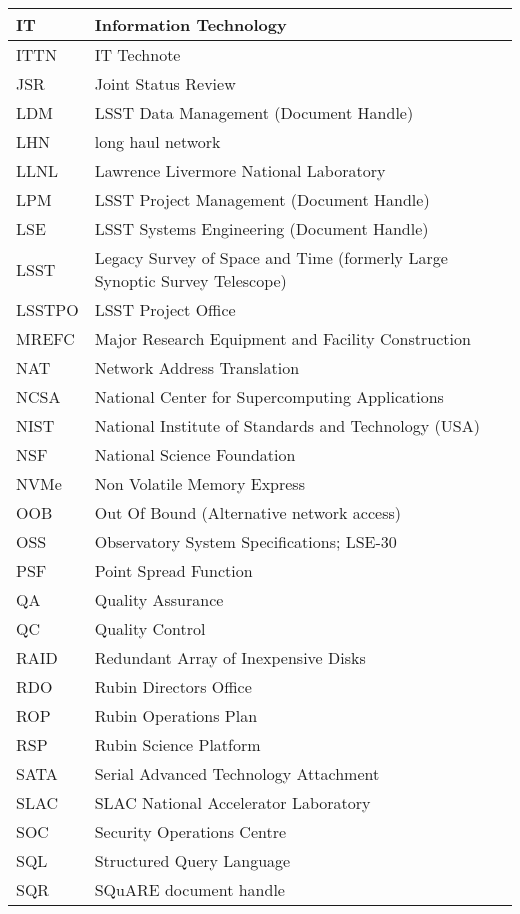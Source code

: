 \begin{longtable}{p{}p{}}
IT & Information Technology \\\hline
ITTN & IT Technote \\\hline
JSR & Joint Status Review \\\hline
LDM & LSST Data Management (Document Handle) \\\hline
LHN & long haul network \\\hline
LLNL & Lawrence Livermore National Laboratory \\\hline
LPM & LSST Project Management (Document Handle) \\\hline
LSE & LSST Systems Engineering (Document Handle) \\\hline
LSST & Legacy Survey of Space and Time (formerly Large Synoptic Survey Telescope) \\\hline
LSSTPO & LSST Project Office \\\hline
MREFC & Major Research Equipment and Facility Construction \\\hline
NAT & Network Address Translation \\\hline
NCSA & National Center for Supercomputing Applications \\\hline
NIST & National Institute of Standards and Technology (USA) \\\hline
NSF & National Science Foundation \\\hline
NVMe & Non Volatile Memory Express \\\hline
OOB & Out Of Bound (Alternative network access) \\\hline
OSS & Observatory System Specifications; LSE-30 \\\hline
PSF & Point Spread Function \\\hline
QA & Quality Assurance \\\hline
QC & Quality Control \\\hline
RAID & Redundant Array of Inexpensive Disks \\\hline
RDO & Rubin Directors Office \\\hline
ROP & Rubin Operations Plan \\\hline
RSP & Rubin Science Platform \\\hline
SATA & Serial Advanced Technology Attachment \\\hline
SLAC & SLAC National Accelerator Laboratory \\\hline
SOC & Security Operations Centre \\\hline
SQL & Structured Query Language \\\hline
SQR & SQuARE document handle \\\hline

\end{longtable}
